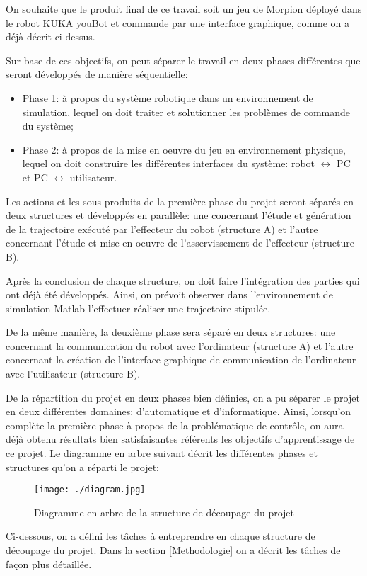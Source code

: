 \label{Div_Trav}

On souhaite que le produit final de ce travail soit un jeu de Morpion déployé dans le robot KUKA youBot et commande par une interface graphique, comme on a déjà décrit ci-dessus. 

Sur base de ces objectifs, on peut séparer le travail en deux phases différentes que seront développés de manière séquentielle:
\begin{itemize}
	\item Phase 1: à propos du système robotique dans un environnement de simulation, lequel on doit traiter et solutionner les problèmes de commande du système;
	\item Phase 2: à propos de la mise en oeuvre du jeu en environnement physique, lequel on doit construire les différentes interfaces du système: robot $ \leftrightarrow $ PC et PC $ \leftrightarrow $ utilisateur.
\end{itemize}


Les actions et les sous-produits de la première phase du projet seront séparés en deux structures et développés en parallèle: une concernant l’étude et génération de la trajectoire exécuté par l’effecteur du robot (structure A) et l’autre concernant l’étude et mise en oeuvre de l’asservissement de l’effecteur (structure B).

Après la conclusion de chaque structure, on doit faire l’intégration des parties qui ont déjà été développés. Ainsi, on prévoit observer dans l’environnement de simulation Matlab l’effectuer réaliser une trajectoire stipulée. 

De la même manière, la deuxième phase sera séparé en deux structures: une concernant la communication du robot avec l’ordinateur (structure A) et l’autre concernant la création de l’interface graphique de communication de l’ordinateur avec l’utilisateur (structure B).

De la répartition du projet en deux phases bien définies, on a pu séparer le projet en deux différentes domaines: d’automatique et d’informatique. Ainsi, lorsqu'on complète la première phase à propos de la problématique de contrôle, on aura déjà obtenu résultats bien satisfaisantes référents les objectifs d'apprentissage de ce projet.
Le diagramme en arbre suivant décrit les différentes phases et structures qu’on a réparti le projet:


\begin{figure}[H]
	\begin{center}	
		\texttt{[image: ./diagram.jpg]}
		\caption{Diagramme en arbre de la structure de découpage du projet }
		\label{fig:diagram}
	\end{center}
\end{figure}
\newpage


Ci-dessous, on a défini les tâches à entreprendre en chaque structure de découpage du projet. Dans la section \ref{Methodologie} on a décrit les tâches de façon plus détaillée.
